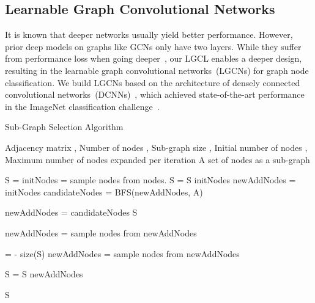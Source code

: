 \documentclass[sigconf]{acmart}
\begin{document}
\subsection{Learnable Graph Convolutional Networks}\label{sec:LGCN}


It is known that deeper networks usually yield better performance.
However, prior deep models on graphs like GCNs only have two layers.
While they suffer from performance loss when going
deeper~\cite{kipf2016semi}, our LGCL enables a deeper design,
resulting in the learnable graph convolutional networks~(LGCNs) for
graph node classification. We build LGCNs based on the architecture
of densely connected convolutional
networks~(DCNNs)~\cite{huang2016densely,he2015deep}, which achieved
state-of-the-art performance in the ImageNet classification
challenge~\cite{ImageNetCNN}.

\begin{algorithm}[t]
\caption{Sub-Graph Selection Algorithm}\label{algo:batch_select}
\begin{algorithmic}[1]
\renewcommand{\algorithmicrequire}{\textbf{Input:}}
\renewcommand{\algorithmicensure}{\textbf{Output:}}
\algnewcommand{}

\Require Adjacency matrix , Number of nodes , Sub-graph size
,
         Initial number of nodes ,
         Maximum number of nodes expanded per iteration 
\Ensure A set of nodes  as a sub-graph

\State S = 
\State initNodes = sample  nodes from  nodes.
\State S = S  initNodes
\State newAddNodes = initNodes
\State candidateNodes = BFS(newAddNodes, A)

\State newAddNodes = candidateNodes   S

\State newAddNodes = sample  nodes from newAddNodes
\EndIf

\State  =  - size(S)
\State newAddNodes = sample  nodes from newAddNodes
\EndIf

\State S = S  newAddNodes

\EndWhile

\State \Return S

\end{algorithmic}
\end{algorithm}
\end{document}
